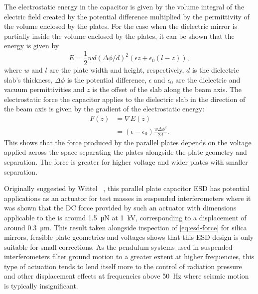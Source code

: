 The electrostatic energy in the capacitor is given by the volume integral of the electric field created by the potential difference multiplied by the permittivity of the volume enclosed by the plates. For the case when the dielectric mirror is partially inside the volume enclosed by the plates, it can be shown that the energy is given by~\cite{Margulies1984}
\begin{equation}
  E = \frac{1}{2} w d \left( \Delta \phi / d \right)^2 \left( \epsilon z + \epsilon_0 \left( l - z \right) \right),
\end{equation}
where $w$ and $l$ are the plate width and height, respectively, $d$ is the dielectric slab's thickness, $\Delta \phi$ is the potential difference, $\epsilon$ and $\epsilon_0$ are the dielectric and vacuum permittivities and $z$ is the offset of the slab along the beam axis. The electrostatic force the capacitor applies to the dielectric slab in the direction of the beam axis is given by the gradient of the electrostatic energy:
\begin{equation}
  \label{eq:esd-force}
  \begin{split}
    F \left( z \right) &= \nabla E \left( z \right) \\
                       &= \left( \epsilon - \epsilon_0 \right) \frac{w \Delta \phi^2}{2 d}.
  \end{split}
\end{equation}
This shows that the force produced by the parallel plates depends on the voltage applied across the space separating the plates alongside the plate geometry and separation. The force is greater for higher voltage and wider plates with smaller separation.

Originally suggested by Wittel \etal{}~\cite{Wittel2015}, this parallel plate capacitor \gls{ESD} has potential applications as an actuator for test masses in suspended interferometers where it was shown that the \gls{DC} force provided by such an actuator with dimensions applicable to the \AEIPROTOTYPE{} is around \SI{1.5}{\micro\newton} at \SI{1}{\kilo\volt}, corresponding to a displacement of around \SI{0.3}{\micro\meter}. This result taken alongside inspection of \cref{eq:esd-force} for silica mirrors, feasible plate geometries and voltages shows that this \gls{ESD} design is only suitable for small corrections. As the pendulum systems used in suspended interferometers filter ground motion to a greater extent at higher frequencies, this type of actuation tends to lend itself more to the control of radiation pressure and other displacement effects at frequencies above \SI{50}{\hertz} where seismic motion is typically insignificant.

